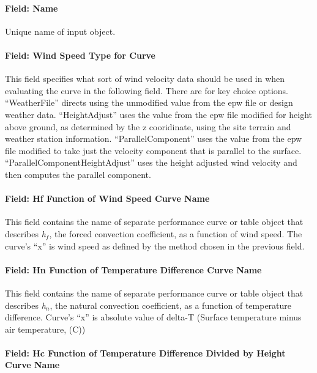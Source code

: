 \paragraph{Field: Name}\label{field-name-8}

Unique name of input object.

\paragraph{Field: Wind Speed Type for Curve}\label{field-wind-speed-type-for-curve}

This field specifies what sort of wind velocity data should be used in when evaluating the curve in the following field. There are for key choice options. ``WeatherFile'' directs using the unmodified value from the epw file or design weather data. ``HeightAdjust'' uses the value from the epw file modified for height above ground, as determined by the z cooridinate, using the site terrain and weather station information. ``ParallelComponent'' uses the value from the epw file modified to take just the velocity component that is parallel to the surface. ``ParallelComponentHeightAdjust'' uses the height adjusted wind velocity and then computes the parallel component.

\paragraph{Field: Hf Function of Wind Speed Curve Name}\label{field-hf-function-of-wind-speed-curve-name}

This field contains the name of separate performance curve or table object that describes \emph{h\(_{f}\)}, the forced convection coefficient, as a function of wind speed. The curve's ``x'' is wind speed as defined by the method chosen in the previous field.

\paragraph{Field: Hn Function of Temperature Difference Curve Name}\label{field-hn-function-of-temperature-difference-curve-name}

This field contains the name of separate performance curve or table object that describes \emph{h\(_{n}\)}, the natural convection coefficient, as a function of temperature difference. Curve's ``x'' is absolute value of delta-T (Surface temperature minus air temperature, (C))

\paragraph{Field: Hc Function of Temperature Difference Divided by Height Curve Name}\label{field-hc-function-of-temperature-difference-divided-by-height-curve-name-1}

